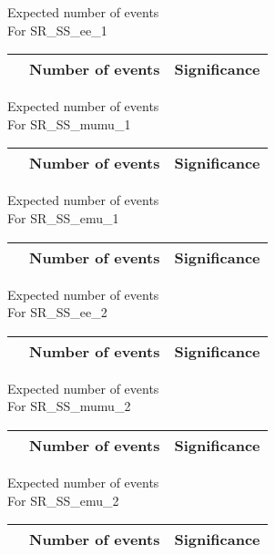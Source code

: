 \begin{frame}{Expected number of events \\ For SR\_SS\_ee\_1}
\vspace{5mm}
\begin{tabular}{|c|c|c|}
\hline
& Number of events & Significance \\
\hline

\end{tabular}
\end{frame}

\begin{frame}{Expected number of events \\ For SR\_SS\_mumu\_1}
\vspace{5mm}
\begin{tabular}{|c|c|c|}
\hline
& Number of events & Significance \\
\hline

\end{tabular}
\end{frame}

\begin{frame}{Expected number of events \\ For SR\_SS\_emu\_1}
\vspace{5mm}
\begin{tabular}{|c|c|c|}
\hline
& Number of events & Significance \\
\hline

\end{tabular}
\end{frame}

\begin{frame}{Expected number of events \\ For SR\_SS\_ee\_2}
\vspace{5mm}
\begin{tabular}{|c|c|c|}
\hline
& Number of events & Significance \\
\hline

\end{tabular}
\end{frame}

\begin{frame}{Expected number of events \\ For SR\_SS\_mumu\_2}
\vspace{5mm}
\begin{tabular}{|c|c|c|}
\hline
& Number of events & Significance \\
\hline

\end{tabular}
\end{frame}

\begin{frame}{Expected number of events \\ For SR\_SS\_emu\_2}
\vspace{5mm}
\begin{tabular}{|c|c|c|}
\hline
& Number of events & Significance \\
\hline

\end{tabular}
\end{frame}

